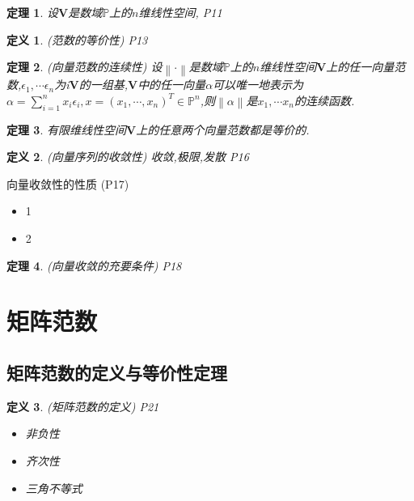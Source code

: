 \documentclass[twoside]{article}
\newtheorem{theorem}{定理}[section]
\newtheorem{definition}{定义}[section]
\newcommand{\norm}[1]{\left\lVert#1\right\rVert}
\begin{document}
  \begin{theorem}
    设$\mathbf{V}$是数域$\mathds{P}$上的$n$维线性空间,
    P11
  \end{theorem}

  \begin{definition}
    (范数的等价性) P13
  \end{definition}

  \begin{theorem}
    (向量范数的连续性)
    设$\norm{\cdot}$是数域$\mathds{P}$上的$n$维线性空间$\mathbf{V}$上的任一向量范数,$\epsilon_1,\cdots \epsilon_n$为i$\mathbf{V}$的一组基,$\mathbf{V}$中的任一向量$\alpha$可以唯一地表示为$\alpha=\sum^n_{i=1} x_i \epsilon_i, x=(x_1,\cdots,x_n)^T \in \mathds{P}^n$,则$\norm{\alpha}$是$x_1,\cdots x_n$的连续函数.
  \end{theorem}

  \begin{theorem}
    有限维线性空间$\mathbf{V}$上的任意两个向量范数都是等价的.
  \end{theorem}

  \begin{definition}
    (向量序列的收敛性) 收敛,极限,发散 P16
  \end{definition}

  向量收敛性的性质 (P17)
  \begin{itemize}
    \item 1
    \item 2
  \end{itemize}

  \begin{theorem}
    (向量收敛的充要条件) P18
  \end{theorem}

\section{矩阵范数}\label{sec:ju_zhen_fan_shu_}
  \subsection{矩阵范数的定义与等价性定理}\label{sub:ju_zhen_fan_shu_de_ding_yi_yu_deng_jie_xing_ding_li_}
    \begin{definition}
      (矩阵范数的定义) P21
      \begin{itemize}
        \item 非负性
        \item 齐次性
        \item 三角不等式
      \end{itemize}
    \end{definition}
\end{document}
